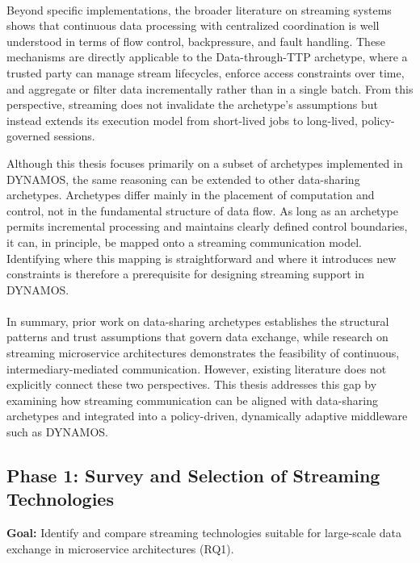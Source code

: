 \documentclass[a4paper,10pt,british]{scrartcl}
\begin{document}
\paragraph{}
Beyond specific implementations, the broader literature on streaming systems shows that continuous data processing with centralized coordination is well understood in terms of flow control, backpressure, and fault handling. These mechanisms are directly applicable to the Data-through-TTP archetype, where a trusted party can manage stream lifecycles, enforce access constraints over time, and aggregate or filter data incrementally rather than in a single batch. From this perspective, streaming does not invalidate the archetype’s assumptions but instead extends its execution model from short-lived jobs to long-lived, policy-governed sessions.

Although this thesis focuses primarily on a subset of archetypes implemented in DYNAMOS, the same reasoning can be extended to other data-sharing archetypes. Archetypes differ mainly in the placement of computation and control, not in the fundamental structure of data flow. As long as an archetype permits incremental processing and maintains clearly defined control boundaries, it can, in principle, be mapped onto a streaming communication model. Identifying where this mapping is straightforward and where it introduces new constraints is therefore a prerequisite for designing streaming support in DYNAMOS.

\paragraph{}
In summary, prior work on data-sharing archetypes establishes the structural patterns and trust assumptions that govern data exchange, while research on streaming microservice architectures demonstrates the feasibility of continuous, intermediary-mediated communication. However, existing literature does not explicitly connect these two perspectives. This thesis addresses this gap by examining how streaming communication can be aligned with data-sharing archetypes and integrated into a policy-driven, dynamically adaptive middleware such as DYNAMOS.

\subsection{Phase 1: Survey and Selection of Streaming Technologies}

\textbf{Goal:} Identify and compare streaming technologies suitable for large-scale data exchange in microservice architectures (RQ1).
\end{document}
